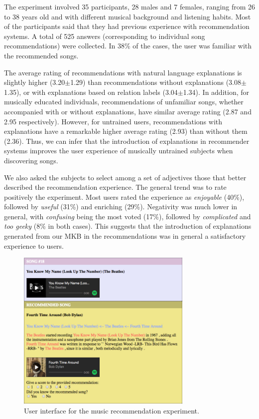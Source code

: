 The experiment involved 35 participants, 28 males and 7 females, ranging from 26 to 38 years old and with different musical background and listening habits. Most of the participants said that they had previous experience with recommendation systems. 
A total of 525 answers (corresponding to individual song recommendations) were collected. In 38\% of the cases, the user was familiar with the recommended songs.

The average rating of recommendations with natural language explanations is slightly higher (3.20$\pm$1.29) than recommendations without explanations (3.08$\pm$1.35), or with explanations based on relation labels (3.04$\pm$1.34). In addition, for musically educated individuals, recommendations of unfamiliar songs, whether accompanied with or without explanations, have similar average rating (2.87 and 2.95 respectively). However, for untrained users, recommendations with explanations have a remarkable higher average rating (2.93) than without them (2.36). Thus, we can infer that the introduction of explanations in recommender systems improves the user experience of musically untrained subjects when discovering songs.

We also asked the subjects to select among a set of adjectives those that better described the recommendation experience. The general trend was to rate positively the experiment. Most users rated the experience as \textit{enjoyable} (40\%), followed by \textit{useful} (31\%) and enriching (29\%). Negativity was much lower in general, with \textit{confusing} being the most voted (17\%), followed by \textit{complicated} and \textit{too geeky} (8\% in both cases). This suggests that the introduction of explanations generated from our MKB in the recommendations was in general a satisfactory experience to users.


\begin{figure}[!htp]
\centerline{
\includegraphics[width=0.75\textwidth]{ch04_kbconstruction_pics/recommender.jpg}}
\caption{User interface for the music recommendation experiment.}
\label{fig:kb:recommender}
\end{figure}

